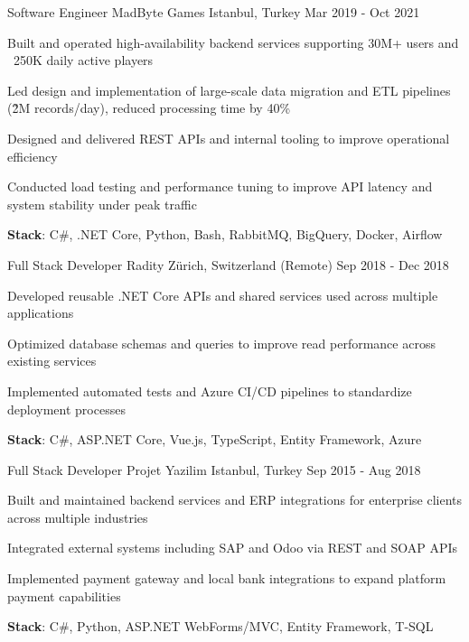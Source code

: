 \begin{cventries}
  \cventry
    {Software Engineer}
    {MadByte Games}
    {Istanbul, Turkey}
    {Mar 2019 - Oct 2021}
    {
      \begin{cvitems}
        \item {Built and operated high-availability backend services supporting 30M+ users and ~250K daily active players}
        \item {Led design and implementation of large-scale data migration and ETL pipelines (\~2M records/day), reduced processing time by 40\%}
        \item {Designed and delivered REST APIs and internal tooling to improve operational efficiency}
        \item {Conducted load testing and performance tuning to improve API latency and system stability under peak traffic}
        \item {\textbf{Stack}: C\#, .NET Core, Python, Bash, RabbitMQ, BigQuery, Docker, Airflow}
      \end{cvitems}
    }

  \cventry
    {Full Stack Developer}
    {Radity}
    {Zürich, Switzerland (Remote)}
    {Sep 2018 - Dec 2018}
    {
      \begin{cvitems}
        \item {Developed reusable .NET Core APIs and shared services used across multiple applications}
        \item {Optimized database schemas and queries to improve read performance across existing services}
        \item {Implemented automated tests and Azure CI/CD pipelines to standardize deployment processes}
        \item {\textbf{Stack}: C\#, ASP.NET Core, Vue.js, TypeScript, Entity Framework, Azure}
      \end{cvitems}
    }

  \cventry
    {Full Stack Developer}
    {Projet Yazilim}
    {Istanbul, Turkey}
    {Sep 2015 - Aug 2018}
    {
      \begin{cvitems}
        \item {Built and maintained backend services and ERP integrations for enterprise clients across multiple industries}
        \item {Integrated external systems including SAP and Odoo via REST and SOAP APIs}
        \item {Implemented payment gateway and local bank integrations to expand platform payment capabilities}
        \item {\textbf{Stack}: C\#, Python, ASP.NET WebForms/MVC, Entity Framework, T-SQL}
      \end{cvitems}
    }


\end{cventries}
